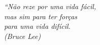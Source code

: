 \begin{epigrafe}
    \vspace*{\fill}
	\begin{flushright}
		\textit{``Não reze por uma vida fácil, \\
		mas sim para ter forças \\
		para uma vida difícil.\\
		(Bruce Lee)}
	\end{flushright}
\end{epigrafe}

